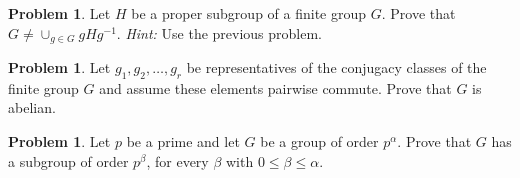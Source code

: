 \documentclass[11pt]{scrartcl}
\theoremstyle{definition}
\newtheorem{problem}[theorem]{Problem}
\begin{document}
\begin{problem}
Let $H$ be a proper subgroup of a finite group $G$. Prove that $G\neq \cup_{g\in G}gHg^{-1}$. \emph{Hint:} Use the previous problem.
\end{problem}

\begin{problem}
Let $g_1,g_2,\ldots, g_r$ be representatives of the conjugacy classes of the finite group $G$ and assume these elements pairwise commute. Prove that $G$ is abelian.
\end{problem}

\begin{problem}
Let $p$ be a prime and let $G$ be a group of order $p^{\alpha}$. Prove that $G$ has a subgroup of order $p^{\beta}$, for every $\beta$ with $0\leq \beta\leq \alpha$.
\end{problem}
\end{document}
